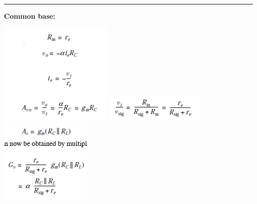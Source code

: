 \documentclass[a4paper]{article}
\newcommand{\hrl}{
    \vspace{2mm}
    \hrule
    \vspace{2mm}
}
\begin{document}
\begin{multicols}{3}
\hrl

\textbf{Common base:}

\includegraphics[width=\linewidth]{imgs/11}
\includegraphics[width=\linewidth]{imgs/12}
\includegraphics[width=\linewidth]{imgs/13}


\end{multicols}
\end{document}
